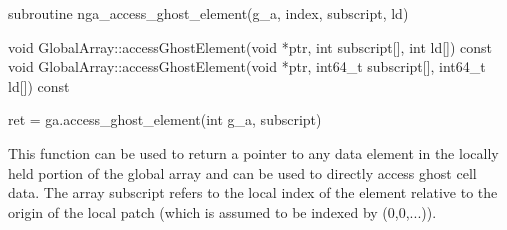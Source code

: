 \documentclass[12pt]{article}
\begin{document}
\begin{fapi}
\begin{fcode}
subroutine nga_access_ghost_element(g_a, index, subscript, ld)
\end{fcode}
\begin{funcargs}
\end{funcargs}
\end{fapi}

\begin{cxxapi}
\begin{cxxcode}
void GlobalArray::accessGhostElement(void *ptr, int subscript[],
                                     int ld[]) const
void GlobalArray::accessGhostElement(void *ptr, int64_t subscript[],
                                     int64_t ld[]) const
\end{cxxcode}
\begin{funcargs}
\end{funcargs}
\end{cxxapi}

\begin{pyapi}
\begin{pycode}
ret = ga.access_ghost_element(int g_a, subscript)
\end{pycode}
\begin{funcargs}
\end{funcargs}
\end{pyapi}

\local

\begin{desc}

This function can be used to return a pointer to any data element in the
locally held portion of the global array and can be used to directly access
ghost cell data. The array subscript refers to the local index of the element
relative to the origin of the local patch (which is assumed to be indexed by
(0,0,...)).

\end{desc}
\end{document}

